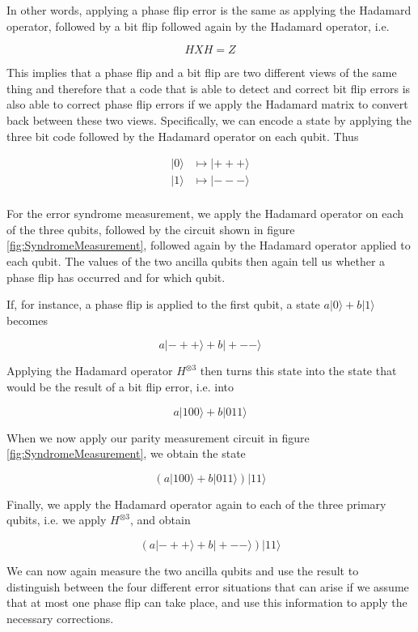 \documentclass[a4paper, draft]{article}
\theoremstyle{own}
\theoremstyle{remark}
\begin{document}
In other words, applying a phase flip error is the same as applying the Hadamard operator, followed by a bit flip followed again by the Hadamard operator, i.e.

$$
H X H = Z
$$

This implies that a phase flip and a bit flip are two different views of the same thing and therefore that a code that is able to detect and correct bit flip errors is also able to correct phase flip errors if we apply the Hadamard matrix to convert back between these two views. Specifically, we can encode a state by applying the three bit code followed by the Hadamard operator on each qubit. Thus

\begin{align*}
|0 \rangle & \mapsto |+++ \rangle \\
|1 \rangle & \mapsto |--- \rangle \\
\end{align*}

For the error syndrome measurement, we apply the Hadamard operator on each of the three qubits, followed by the circuit shown in figure \ref{fig:SyndromeMeasurement}, followed again by the Hadamard operator applied to each qubit. The values of the two ancilla 	qubits then again tell us whether a phase flip has occurred and for which qubit. 

If, for instance, a phase flip is applied to the first qubit, a state $a |0 \rangle + b |1\rangle$ becomes

$$
a |-++ \rangle + b |+-- \rangle
$$

Applying the Hadamard operator $H^{\otimes 3}$ then turns this state into the state that would be the result of a bit flip error, i.e. into

$$
a |100 \rangle + b |011 \rangle
$$

When we now apply our parity measurement circuit in figure \ref{fig:SyndromeMeasurement}, we obtain the state

$$
(a |100 \rangle + b |011 \rangle) |11 \rangle
$$

Finally, we apply the Hadamard operator again to each of the three primary qubits, i.e. we apply $H^{\otimes 3}$, and obtain

$$
(a |-++ \rangle + b |+-- \rangle) |11 \rangle
$$

We can now again measure the two ancilla qubits and use the result to distinguish between the four different error situations that can arise if we assume that at most one phase flip can take place, and use this information to apply the necessary corrections.
\end{document}
